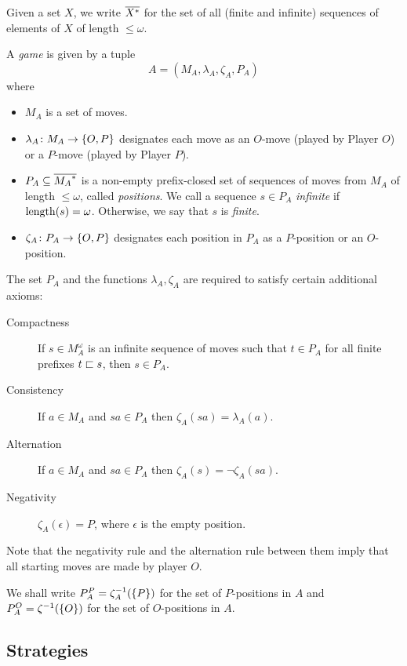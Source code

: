 \documentclass{article}
\begin{document}
\begin{definition}

  Given a set $X$, we write ${\overline{{X}^{*}}}$ for the set of all (finite and infinite) sequences of elements of $X$ of length $\le \omega$.  

  A \emph{game} is given by a tuple
  \[
    A = (M_A, \lambda_A, \zeta_A, P_A)
    \]
  where
  \begin{itemize}
    \item $M_A$ is a set of moves.
    \item $\lambda_A\colon M_A\to\{O,P\}$ designates each move as an $O$-move (played by Player $O$) or a $P$-move (played by Player $P$).  
    \item $P_A\subseteq {\overline{{M_A}^{*}}}$ is a non-empty prefix-closed set of sequences of moves from $M_A$ of length $\le\omega$, called \emph{positions}.  We call a sequence $s\in P_A$ \emph{infinite} if $\operatorname{length}(s)=\omega$.  Otherwise, we say that $s$ is \emph{finite}.
    \item $\zeta_A\colon P_A\to\{O,P\}$ designates each position in $P_A$ as a $P$-position or an $O$-position.
  \end{itemize}

  The set $P_A$ and the functions $\lambda_A,\zeta_A$ are required to satisfy certain additional axioms:
  \begin{description}
    \item[Compactness] If $s\in M_A^\omega$ is an infinite sequence of moves such that $t\in P_A$ for all finite prefixes $t\sqsubset s$, then $s\in P_A$.
    \item[Consistency] If $a\in M_A$ and $sa\in P_A$ then $\zeta_A(sa)=\lambda_A(a)$.
    \item[Alternation] If $a\in M_A$ and $sa\in P_A$ then $\zeta_A(s) = \neg \zeta_A(sa)$.
    \item[Negativity] $\zeta_A(\epsilon)=P$, where $\epsilon$ is the empty position.
  \end{description}

  Note that the negativity rule and the alternation rule between them imply that all starting moves are made by player $O$.  
\end{definition}

We shall write $P_A^P=\zeta_A^{-1}(\{P\})$ for the set of $P$-positions in $A$ and $P_A^O=\zeta^{-1}(\{O\})$ for the set of $O$-positions in $A$.

\subsection{Strategies}
\end{document}
